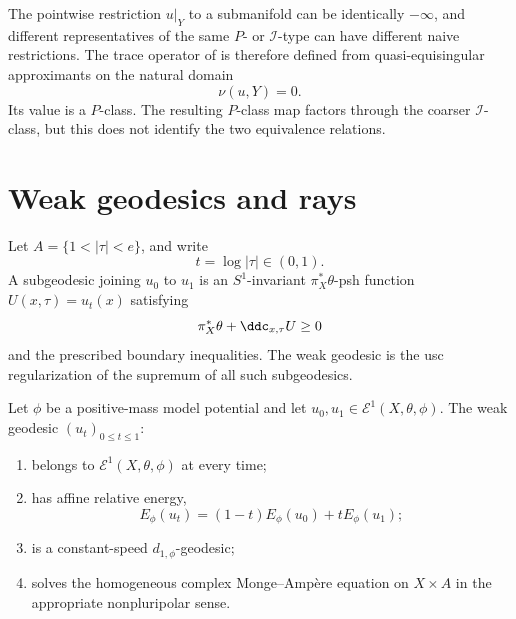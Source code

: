 \begin{remark}
\label{rem:appH-restriction-trace}
The pointwise restriction \(u|_Y\) to a submanifold can be identically
\(-\infty\), and different representatives of the same \(P\)- or
\(\mathcal I\)-type can have different naive restrictions. The trace
operator of  is therefore defined from
quasi-equisingular approximants on the natural domain
\[
                         \nu(u,Y)=0.
\]
Its value is a \(P\)-class. The resulting \(P\)-class map factors through
the coarser \(\mathcal I\)-class, but this does not identify the two
equivalence relations.
\end{remark}

\section{Weak geodesics and rays}
\label{sec:appH-geodesics}

Let \(A=\{1<|\tau|<e\}\), and write
\[
                         t=\log|\tau|\in(0,1).
\]
A subgeodesic joining \(u_0\) to \(u_1\) is an \(S^1\)-invariant
\(\pi_X^*\theta\)-psh function \(U(x,\tau)=u_t(x)\) satisfying
\[
                         \pi_X^*\theta+\ddc_{x,\tau}U\geq0
\]
and the prescribed boundary inequalities. The weak geodesic is the usc
regularization of the supremum of all such subgeodesics.

\begin{theorem}\label{thm:appH-weak-geodesic}
Let \(\phi\) be a positive-mass model potential and let
\(u_0,u_1\in\mathcal E^1(X,\theta,\phi)\). The weak geodesic
\((u_t)_{0\leq t\leq1}\):
\begin{enumerate}
\item belongs to \(\mathcal E^1(X,\theta,\phi)\) at every time;
\item has affine relative energy,
\[
                         E_\phi(u_t)
          =(1-t)E_\phi(u_0)+tE_\phi(u_1);
\]
\item is a constant-speed \(d_{1,\phi}\)-geodesic;
\item solves the homogeneous complex Monge--Amp\`ere equation on
\(X\times A\) in the appropriate nonpluripolar sense.
\end{enumerate}
\end{theorem}

